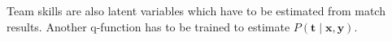 \documentclass[12pt,a4paper]{book}
\newcommand\bs[1]{\boldsymbol{#1}}
\begin{document}
Team skills are also latent variables which have to be estimated from match results.
Another q-function has to be trained to estimate $P(\bs{t}\mid\bs{x},\bs{y})$.
%	
%	
% 	
% 	
% 	
% 	
% 	
%	
\end{document}
